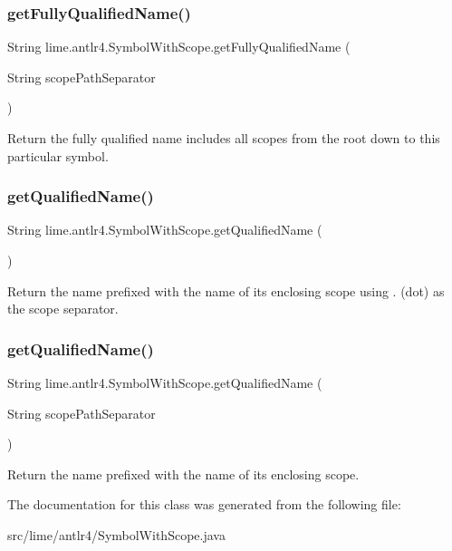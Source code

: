 \subsubsection{\texorpdfstring{get\+Fully\+Qualified\+Name()}{getFullyQualifiedName()}}
{\footnotesize\ttfamily String lime.\+antlr4.\+Symbol\+With\+Scope.\+get\+Fully\+Qualified\+Name (\begin{DoxyParamCaption}\item[{String}]{scope\+Path\+Separator }\end{DoxyParamCaption})}

Return the fully qualified name includes all scopes from the root down to this particular symbol. \mbox{\label{classlime_1_1antlr4_1_1SymbolWithScope_a84495a0d09bc077969de2108fab615c1}} 
\subsubsection{\texorpdfstring{get\+Qualified\+Name()}{getQualifiedName()}\hspace{0.1cm}{\footnotesize\ttfamily [1/2]}}
{\footnotesize\ttfamily String lime.\+antlr4.\+Symbol\+With\+Scope.\+get\+Qualified\+Name (\begin{DoxyParamCaption}{ }\end{DoxyParamCaption})}

Return the name prefixed with the name of its enclosing scope using \textquotesingle{}.\textquotesingle{} (dot) as the scope separator. \mbox{\label{classlime_1_1antlr4_1_1SymbolWithScope_a65ee148391eeb9a5784bf2c2eccb54d3}} 
\subsubsection{\texorpdfstring{get\+Qualified\+Name()}{getQualifiedName()}\hspace{0.1cm}{\footnotesize\ttfamily [2/2]}}
{\footnotesize\ttfamily String lime.\+antlr4.\+Symbol\+With\+Scope.\+get\+Qualified\+Name (\begin{DoxyParamCaption}\item[{String}]{scope\+Path\+Separator }\end{DoxyParamCaption})}

Return the name prefixed with the name of its enclosing scope. 

The documentation for this class was generated from the following file\+:\begin{DoxyCompactItemize}
\item 
src/lime/antlr4/Symbol\+With\+Scope.\+java\end{DoxyCompactItemize}
